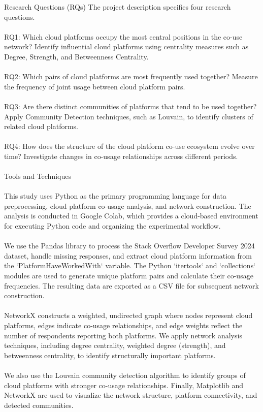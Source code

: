 \documentclass{article}
\begin{document}
\begin{itemize}
{{Research Questions (RQs)
The project description specifies four research questions.
\\\\
RQ1: Which cloud platforms occupy the most central positions in the co-use network?
Identify influential cloud platforms using centrality measures such as Degree, Strength, and Betweenness Centrality.
\\\\
RQ2: Which pairs of cloud platforms are most frequently used together?
Measure the frequency of joint usage between cloud platform pairs.
\\\\
RQ3: Are there distinct communities of platforms that tend to be used together?
Apply Community Detection techniques, such as Louvain, to identify clusters of related cloud platforms.
\\\\
RQ4: How does the structure of the cloud platform co-use ecosystem evolve over time?
Investigate changes in co-usage relationships across different periods.
\\\\
Tools and Techniques
\\\\
This study uses Python as the primary programming language for data preprocessing, cloud platform co-usage analysis, and network construction. The analysis is conducted in Google Colab, which provides a cloud-based environment for executing Python code and organizing the experimental workflow.
\\\\
We use the Pandas library to process the Stack Overflow Developer Survey 2024 dataset, handle missing responses, and extract cloud platform information from the `PlatformHaveWorkedWith` variable. The Python `itertools` and `collections` modules are used to generate unique platform pairs and calculate their co-usage frequencies. The resulting data are exported as a CSV file for subsequent network construction.
\\\\
NetworkX constructs a weighted, undirected graph where nodes represent cloud platforms, edges indicate co-usage relationships, and edge weights reflect the number of respondents reporting both platforms. We apply network analysis techniques, including degree centrality, weighted degree (strength), and betweenness centrality, to identify structurally important platforms.
\\\\
We also use the Louvain community detection algorithm to identify groups of cloud platforms with stronger co-usage relationships. Finally, Matplotlib and NetworkX are used to visualize the network structure, platform connectivity, and detected communities.}
\\\\

}
\end{itemize}
\end{document}
